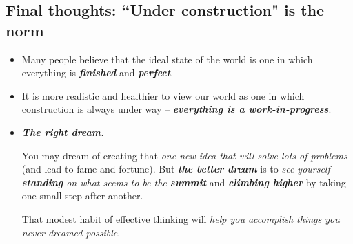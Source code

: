 \documentclass[11pt]{article}
\begin{document}
\subsection{Final thoughts: ``Under construction" is the norm}
\begin{itemize}
\item Many people believe that the ideal state of the world is one in which everything is \emph{\textbf{finished}} and \emph{\textbf{perfect}}.

\item It is more realistic and healthier to view our world as one in which construction is always under way -- \emph{\textbf{everything is a work-in-progress}}.

\item \emph{\textbf{The right dream.}}

You may dream of creating that \emph{one new idea that will solve lots of problems} (and lead to fame and fortune). But \emph{\textbf{the better dream}} is to \emph{see yourself \textbf{standing} on what seems to be the \textbf{summit}} and \emph{\textbf{climbing higher}} by taking one small step after another. 

That modest habit of effective thinking will \emph{help you accomplish things you never dreamed possible}.
\end{itemize}
\end{document}
